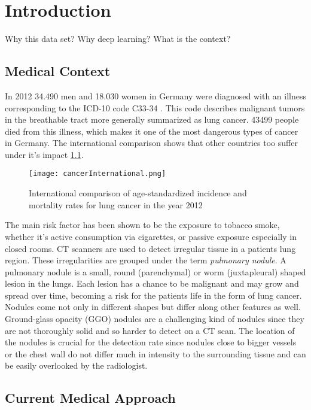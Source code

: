 \documentclass[main.tex]{subfiles}
\begin{document}
\chapter{Introduction}
Why this data set?
Why deep learning?
What is the context?

\section{Medical Context}
In 2012 34.490 men and 18.030 women in Germany were diagnosed with an illness corresponding to the ICD-10 code C33-34 \cite{koch2015krebs}. This code describes malignant tumors in the breathable tract more generally summarized as lung cancer. 43499 people died from this illness, which makes it one of the most dangerous types of cancer in Germany. The international comparison shows that other countries too suffer under it's impact \ref{fig:cancInt}.

\begin{figure}[ht]
\texttt{[image: cancerInternational.png]}
\caption{International comparison of age-standardized incidence and mortality rates for lung cancer in the year 2012}
\label{fig:cancInt}
\end{figure}

The main risk factor has been shown to be the exposure to tobacco smoke, whether it's active consumption via cigarettes, or passive exposure especially in closed rooms. CT scanners are used to detect irregular tissue in a patients lung region. These irregularities are grouped under the term \textit{pulmonary nodule}. A pulmonary nodule is a small, round (parenchymal) or worm (juxtapleural) shaped lesion in the lungs. Each lesion has a chance to be malignant and may grow and spread over time, becoming a risk for the patients life in the form of lung cancer. Nodules come not only in different shapes but differ along other features as well. Ground-glass opacity (GGO) nodules are a challenging kind of nodules since they are not thoroughly solid and so harder to detect on a CT scan. The location of the nodules is crucial for the detection rate since nodules close to bigger vessels or the chest wall do not differ much in intensity to the surrounding tissue and can be easily overlooked by the radiologist.


\section{Current Medical Approach}
\end{document}
